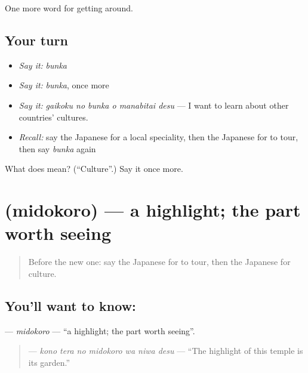 \begin{grammarlens}[title={What you've built}]
One more word for getting around.
\end{grammarlens}

\subsection*{Your turn}
\begin{itemize}
\raggedright
  \item \emph{Say it:} \emph{bunka}
  \item \emph{Say it:} \emph{bunka}, once more
  \item \emph{Say it:} \emph{gaikoku no bunka o manabitai desu} — I want to learn about other countries' cultures.
  \item \emph{Recall:} say the Japanese for a local speciality, then the Japanese for to tour, then say \emph{bunka} again
\end{itemize}

\begin{tcolorbox}[breakable,colback=teal!4,colframe=teal!35!black,title={Before you move on}]
What does  mean? (\textquotedblleft{}Culture\textquotedblright{}.) Say it once more.
\end{tcolorbox}
\section[\texorpdfstring{\ja{みどころ} (midokoro)}{みどころ (midokoro)}]{ (midokoro) — a highlight; the part worth seeing}

\label{lesson:JA-C403-midokoro}



\begin{quote}
Before the new one: say the Japanese for to tour, then the Japanese for culture.
\end{quote}

\subsection*{You'll want to know: }
\textbf{} — \emph{midokoro} — \textquotedblleft{}a highlight; the part worth seeing\textquotedblright{}.

\begin{quote}
\textbf{   } — \emph{kono tera no midokoro wa niwa desu} — \textquotedblleft{}The highlight of this temple is its garden.\textquotedblright{}
\end{quote}

